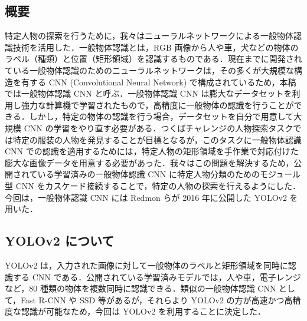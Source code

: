 \documentclass[twocolumn,10pt]{jarticle}
\begin{document}
\subsection{概要}
特定人物の探索を行うために，我々はニューラルネットワークによる一般物体認識技術を活用した．一般物体認識とは，RGB 画像から人や車，犬などの物体のラベル（種類）と位置（矩形領域）を認識するものである．現在までに開発されている一般物体認識のためのニューラルネットワークは，その多くが大規模な構造を有する CNN (Convolutional Neural Network) で構成されているため，本稿では一般物体認識 CNN と呼ぶ．一般物体認識 CNN は膨大なデータセットを利用し強力な計算機で学習されたもので，高精度に一般物体の認識を行うことができる．しかし，特定の物体の認識を行う場合，データセットを自分で用意して大規模 CNN の学習をやり直す必要がある．つくばチャレンジの人物探索タスクでは特定の服装の人物を発見することが目標となるが，このタスクに一般物体認識 CNN での認識を適用するためには，特定人物の矩形領域を手作業で対応付けた膨大な画像データを用意する必要があった．我々はこの問題を解決するため，公開されている学習済みの一般物体認識 CNN に特定人物分類のためのモジュール型 CNN をカスケード接続することで，特定の人物の探索を行えるようにした．今回は，一般物体認識 CNN には Redmon らが 2016 年に公開した YOLOv2\cite{yolo} を用いた．
\subsection{YOLOv2 について}
YOLOv2 は，入力された画像に対して一般物体のラベルと矩形領域を同時に認識する CNN である．公開されている学習済みモデルでは，人や車，電子レンジなど，80 種類の物体を複数同時に認識できる．類似の一般物体認識 CNN として，Fast R-CNN\cite{fast_r-cnn} や SSD\cite{ssd} 等があるが，それらより YOLOv2 の方が高速かつ高精度な認識が可能なため，今回は YOLOv2 を利用することに決定した．
\end{document}
